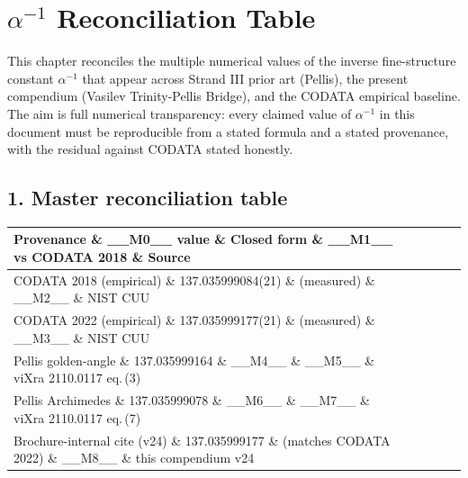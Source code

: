 
\section{$\alpha^{-1}$ Reconciliation Table}

This chapter reconciles the multiple numerical values of the inverse fine-structure constant $\alpha^{-1}$ that appear across Strand III prior art (Pellis), the present compendium (Vasilev Trinity-Pellis Bridge), and the CODATA empirical baseline. The aim is full numerical transparency: every claimed value of $\alpha^{-1}$ in this document must be reproducible from a stated formula and a stated provenance, with the residual against CODATA stated honestly.

\subsection{1. Master reconciliation table}

\begin{table}[H]
\centering
\footnotesize
\setlength{\tabcolsep}{4pt}
\renewcommand{\arraystretch}{1.3}
\begin{tabularx}{\linewidth}{@{}>{\raggedright\arraybackslash}p{2.6cm} l >{\raggedright\arraybackslash}X r >{\raggedright\arraybackslash}p{2.6cm}@{}}
\toprule
\textbf{Provenance} \& \textbf{\_\_M0\_\_ value} \& \textbf{Closed form} \& \textbf{\_\_M1\_\_ vs CODATA 2018} \& \textbf{Source} \\
\midrule
CODATA 2018 (empirical)         \& 137.035999084(21) \& (measured)                                                       \& \_\_M2\_\_                  \& NIST CUU \\
CODATA 2022 (empirical)         \& 137.035999177(21) \& (measured)                                                       \& \_\_M3\_\_ \& NIST CUU \\
Pellis golden-angle             \& 137.035999164     \& \_\_M4\_\_                   \& \_\_M5\_\_ \& viXra 2110.0117 eq.\,(3) \\
Pellis Archimedes               \& 137.035999078     \& \_\_M6\_\_              \& \_\_M7\_\_ \& viXra 2110.0117 eq.\,(7) \\
Brochure-internal cite (v24)    \& 137.035999177     \& (matches CODATA 2022)                                                   \& \_\_M8\_\_ \& this compendium v24 \\
\bottomrule
\end{tabularx}
\end{table}

